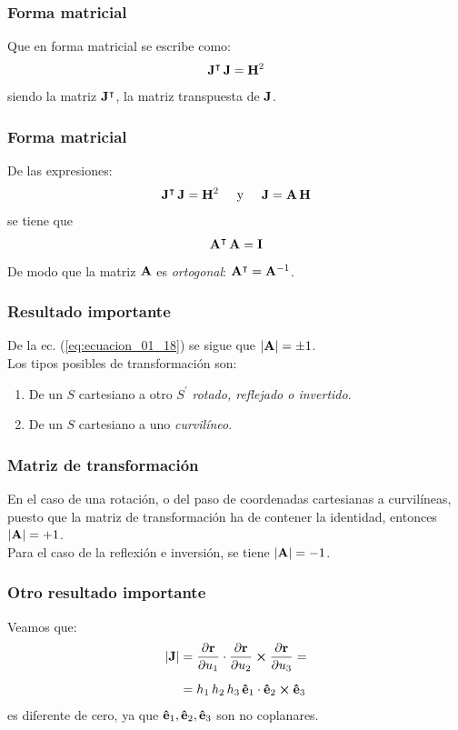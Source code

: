 \documentclass[12pt]{beamer}
\begin{document}
\begin{frame}
\frametitle{Forma matricial}
Que en forma matricial se escribe como:
\pause
\begin{align*}
\vb{J}^{\intercal} \, \vb{J} = \vb{H}^{2}
\end{align*}
siendo la matriz $\vb{J}^{\intercal}$, la matriz transpuesta de $\vb{J}$.
\end{frame}
\begin{frame}
\frametitle{Forma matricial}
De las expresiones:
\pause
\begin{align*}
\vb{J}^{\intercal} \, \vb{J} = \vb{H}^{2} \hspace{0.5cm} \mbox{y} \hspace{0.5cm} \vb{J} = \vb{A} \, \vb{H}
\end{align*}
se tiene que
\begin{align}
\vb{A}^{\intercal} \, \vb{A} = \vb{I}
\label{eq:ecuacion_01_18}
\end{align}
\pause
De modo que la matriz $\vb{A}$ es \emph{ortogonal}: $\vb{A}^{\intercal} = \vb{A}^{-1}$.
\end{frame}
\begin{frame}
\frametitle{Resultado importante}
De la ec. (\ref{eq:ecuacion_01_18}) se sigue que $\abs{\vb{A}} = \pm 1$.
\\
\bigskip
\pause
Los tipos posibles de transformación son:
\begin{enumerate}[<+->]
\item De un $S$ cartesiano a otro $S^{\prime}$ \emph{rotado, reflejado o invertido}.
\item De un $S$ cartesiano a uno \emph{curvilíneo}.
\end{enumerate}
\end{frame}
\begin{frame}
\frametitle{Matriz de transformación}
En el caso de una rotación, o del paso de coordenadas cartesianas a curvilíneas, puesto que la matriz de transformación ha de contener la identidad, entonces $\abs{\vb{A}} = +1$.
\\
\bigskip
\pause
Para el caso de la reflexión e inversión, se tiene $\abs{\vb{A}} = -1$.
\end{frame}
\begin{frame}
\frametitle{Otro resultado importante}
Veamos que:
\pause
\begin{align*}
\abs{\vb{J}} &= \pdv{\vb{r}}{u_{1}} \cdot \pdv{\vb{r}}{u_{2}} \cp \pdv{\vb{r}}{u_{3}} = \\[0.5em]
&= h_{1} \, h_{2} \, h_{3} \, \vu{e}_{1} \cdot \vu{e}_{2} \cp \vu{e}_{3}
\end{align*}
es diferente de cero, ya que $\vu{e}_{1}, \vu{e}_{2}, \vu{e}_{3}$ son no coplanares.
\end{frame}
\end{document}
